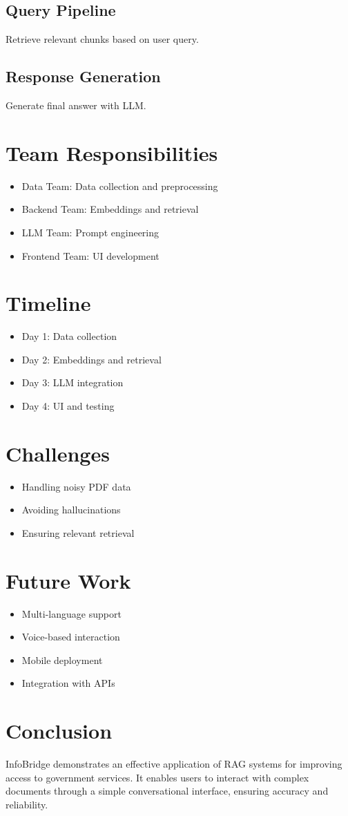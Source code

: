 \documentclass[11pt]{article}
\begin{document}
\subsection{Query Pipeline}
Retrieve relevant chunks based on user query.

\subsection{Response Generation}
Generate final answer with LLM.

\section{Team Responsibilities}
\begin{itemize}
    \item Data Team: Data collection and preprocessing
    \item Backend Team: Embeddings and retrieval
    \item LLM Team: Prompt engineering
    \item Frontend Team: UI development
\end{itemize}

\section{Timeline}
\begin{itemize}
    \item Day 1: Data collection
    \item Day 2: Embeddings and retrieval
    \item Day 3: LLM integration
    \item Day 4: UI and testing
\end{itemize}

\section{Challenges}
\begin{itemize}
    \item Handling noisy PDF data
    \item Avoiding hallucinations
    \item Ensuring relevant retrieval
\end{itemize}

\section{Future Work}
\begin{itemize}
    \item Multi-language support
    \item Voice-based interaction
    \item Mobile deployment
    \item Integration with APIs
\end{itemize}

\section{Conclusion}
InfoBridge demonstrates an effective application of RAG systems for improving access to government services. It enables users to interact with complex documents through a simple conversational interface, ensuring accuracy and reliability.
\end{document}

